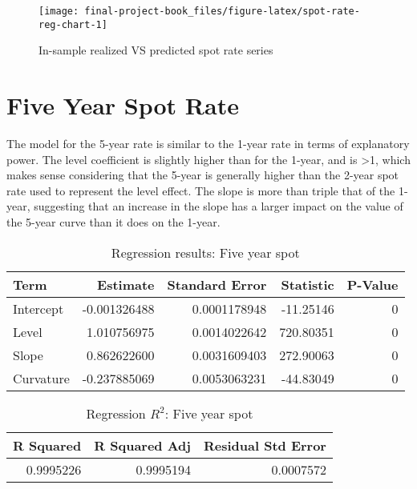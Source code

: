 \documentclass[openany]{book}
\theoremstyle{definition}
\theoremstyle{definition}
\theoremstyle{definition}
\theoremstyle{remark}
\begin{document}
\small

\begin{figure}[H]

{\centering \texttt{[image: final-project-book\_files/figure-latex/spot-rate-reg-chart-1]} 

}

\caption{In-sample realized VS predicted spot rate series}\label{fig:spot-rate-reg-chart}
\end{figure}

\normalsize

\hypertarget{five-year-spot-rate}{%
\section{Five Year Spot Rate}\label{five-year-spot-rate}}

The model for the 5-year rate is similar to the 1-year rate in terms of
explanatory power. The level coefficient is slightly higher than for the
1-year, and is \textgreater{}1, which makes sense considering that the
5-year is generally higher than the 2-year spot rate used to represent
the level effect. The slope is more than triple that of the 1-year,
suggesting that an increase in the slope has a larger impact on the
value of the 5-year curve than it does on the 1-year.

\small

\begin{table}[H]

\caption{\label{tab:five-year-reg}Regression results: Five year spot}
\centering
\begin{tabular}[t]{lrrrr}
\toprule
Term & Estimate & Standard Error & Statistic & P-Value\\
\midrule
Intercept & -0.001326488 & 0.0001178948 & -11.25146 & 0\\
Level & 1.010756975 & 0.0014022642 & 720.80351 & 0\\
Slope & 0.862622600 & 0.0031609403 & 272.90063 & 0\\
Curvature & -0.237885069 & 0.0053063231 & -44.83049 & 0\\
\bottomrule
\end{tabular}
\end{table}

\normalsize

\small

\begin{table}[H]

\caption{\label{tab:five-year-reg-r2}Regression $R^2$: Five year spot}
\centering
\begin{tabular}[t]{rrr}
\toprule
R Squared & R Squared Adj & Residual Std Error\\
\midrule
0.9995226 & 0.9995194 & 0.0007572\\
\bottomrule
\end{tabular}
\end{table}
\end{document}
